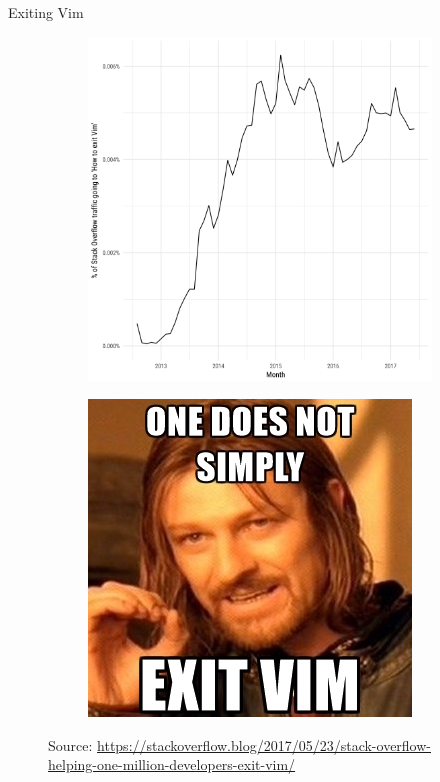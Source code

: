 \documentclass{beamer}
\begin{document}
\begin{frame}{Exiting Vim}
  \begin{figure}
    \centering
    \begin{subfigure}{.5\textwidth}
      \centering
      \includegraphics[width=.9\linewidth]{exiting_vim.png}
    \end{subfigure}%
    \begin{subfigure}{.5\textwidth}
      \centering
      \includegraphics[width=.9\linewidth]{vim_meme.jpeg}
    \end{subfigure}
    \caption{Source: \url{https://stackoverflow.blog/2017/05/23/stack-overflow-helping-one-million-developers-exit-vim/}}
  \end{figure}
\end{frame}
\end{document}
